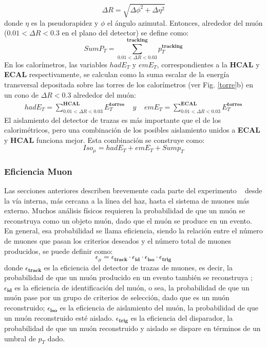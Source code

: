 \begin{equation}\label{deltaR}
\Delta R = \sqrt{\Delta \phi^2 + \Delta\eta^2}
\end{equation}
donde $\eta$ es la pseudorapidez y $\phi$ el ángulo azimutal. Entonces, alrededor del muón ($0.01 < \Delta R < 0.3$ en el plano del detector) se define como:
\begin{equation}\label{sumPT}
SumP_T =\sum_{0.01<\Delta R <0.03}^\mathbf{tracking} p_T^\mathbf{tracking}
\end{equation}
En los calorímetros, las variables $hadE_T$ y $emE_T$, correspondientes a la \textbf{HCAL} y \textbf{ECAL} respectivamente, se calculan como la suma escalar de la energía transversal depositada sobre las torres de los calorímetros (ver Fig. \ref{torre}b) en un cono de $\Delta R < 0.3$ alrededor del muón:
\begin{eqnarray}
hadE_T =\sum_{0.01<\Delta R <0.03}^\mathbf{HCAL} E_T^\mathbf{torres}  ~~~~~ y ~~~~~ emE_T =\sum_{0.01<\Delta R <0.03}^\mathbf{ECAL} E_T^\mathbf{torres} 
\end{eqnarray}
El aislamiento del detector de trazas es más importante que el de los calorimétricos, pero una combinación de los posibles aislamiento unidos a \textbf{ECAL} y \textbf{HCAL} funciona mejor. Esta combinación se construye como:
\begin{equation}\label{iso}
Iso_\mu = hadE_T + emE_T  +Sump_T
\end{equation}





\subsubsection{Eficiencia Muon}

Las secciones anteriores describen brevemente cada parte del experimento \CMS ~ desde la vía interna, más cercana a la línea del haz, hasta el sistema de muones más externo. Muchos análisis físicos requieren la probabilidad de que un muón se reconstruya como un objeto muón, dado que el muón se produce en un evento. En general, esa probabilidad se llama eficiencia, siendo la relación entre el número de muones que pasan los criterios deseados y el número total de muones producidos, se puede definir como:
\begin{equation}
\epsilon_\mu = \epsilon_\mathbf{track} \cdot \epsilon_\mathbf{id} \cdot 
\epsilon_\mathbf{iso} \cdot  \epsilon_\mathbf{trig}
\end{equation}
donde $\epsilon_\mathbf{track}$ es la eficiencia del detector de trazas de muones, es decir, la probabilidad de que un muón producido en un evento también se reconstruya%
; $\epsilon_\mathbf{id}$ es la eficiencia de identificación del muón, o sea, la probabilidad de que un muón pase por un grupo de criterios de selección, dado que es un muón reconstruido; $\epsilon_\mathbf{iso}$ es la eficiencia de aislamiento del muón, la probabilidad de que un muón reconstruido esté aislado. $\epsilon_\mathbf{trig}$ es la eficiencia del disparador, la probabilidad de que un muón reconstruido y aislado se dispare en términos de un umbral de $p_{T}$ dado.


